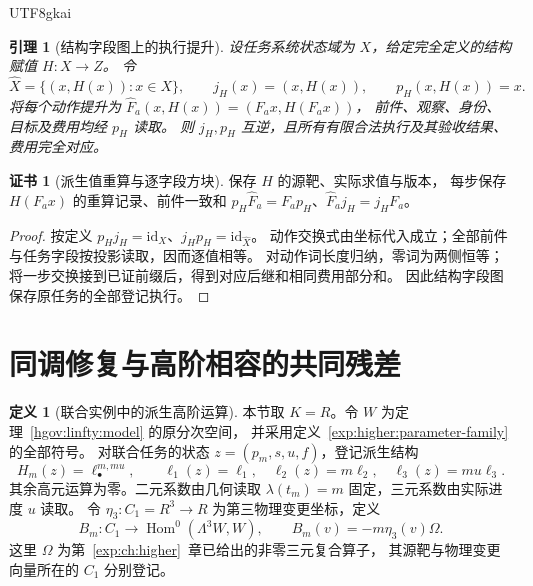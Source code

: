 \documentclass[12pt,a4paper,openany,notitlepage]{report}
\theoremstyle{plain}
\newtheorem{lemma}[theorem]{引理}
\theoremstyle{definition}
\newtheorem{definition}[theorem]{定义}
\newtheorem*{certificate}{证书}
\theoremstyle{remark}
\def\mathcal#1{#1}\def\mathsf#1{#1}\def\mathbb#1{#1}%
\begin{document}
\begin{CJK*}{UTF8}{gkai}
\begin{lemma}[结构字段图上的执行提升]
\label{exp:joint:derived-fields}
设任务系统状态域为 $X$，给定完全定义的结构赋值 $H:X\to Z$。
令
\[
 \widehat X=\{(x,H(x)):x\in X\},\qquad
 j_H(x)=(x,H(x)),\qquad p_H(x,H(x))=x.
\]
将每个动作提升为
$\widehat F_a(x,H(x))=(F_a x,H(F_a x))$，
前件、观察、身份、目标及费用均经 $p_H$ 读取。
则 $j_H,p_H$ 互逆，且所有有限合法执行及其验收结果、费用完全对应。
\end{lemma}
\begin{certificate}[派生值重算与逐字段方块]
保存 $H$ 的源靶、实际求值与版本，
每步保存 $H(F_ax)$ 的重算记录、前件一致和
$p_H\widehat F_a=F_ap_H$、$\widehat F_aj_H=j_HF_a$。
\end{certificate}
\begin{proof}
按定义 $p_Hj_H=\mathrm{id}_X$、$j_Hp_H=\mathrm{id}_{\widehat X}$。
动作交换式由坐标代入成立；全部前件与任务字段按投影读取，因而逐值相等。
对动作词长度归纳，零词为两侧恒等；
将一步交换接到已证前缀后，得到对应后继和相同费用部分和。
因此结构字段图保存原任务的全部登记执行。
\end{proof}

\section{同调修复与高阶相容的共同残差}

\begin{definition}[联合实例中的派生高阶运算]
\label{exp:joint:algebra-lift}
本节取 $\mathbb K=\mathbb R$。令 $W$ 为定理~\ref{hgov:linfty:model} 的原分次空间，
并采用定义~\ref{exp:higher:parameter-family} 的全部符号。
对联合任务的状态 $z=(p_m,s,u,f)$，登记派生结构
\[
 H_m(z)=\ell_\bullet^{m,mu},\qquad
 \ell_1(z)=\ell_1,\quad
 \ell_2(z)=m\ell_2,\quad
 \ell_3(z)=mu\ell_3.
\]
其余高元运算为零。二元系数由几何读取
$\lambda(t_m)=m$ 固定，三元系数由实际进度 $u$ 读取。
令 $\eta_3:C_1=\mathbb R^3\to\mathbb R$ 为第三物理变更坐标，定义
\[
 \mathcal B_m:C_1\longrightarrow
 \operatorname{Hom}^{0}(\Lambda^3W,W),\qquad
 \mathcal B_m(v)=-m\eta_3(v)\Omega.
\]
这里 $\Omega$ 为第~\ref{exp:ch:higher}~章已给出的非零三元复合算子，
其源靶与物理变更向量所在的 $C_1$ 分别登记。
\end{definition}


\end{CJK*}
\end{document}

